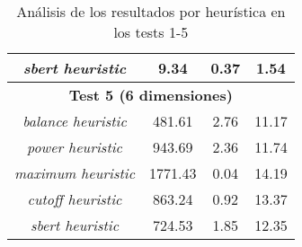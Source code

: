 \documentclass{article}
\begin{document}
\begin{table}[H]
{\begin{tabular}{|c|c|c|c|}
\textit{sbert heuristic} & 9.34 & 0.37 & 1.54 \\ \hline
\multicolumn{4}{|c|}{\textbf{Test 5 (6 dimensiones)}} \\ \hline
\textit{balance heuristic} & 481.61 & 2.76 & 11.17 \\ \hline
\textit{power heuristic} & 943.69 & 2.36 & 11.74 \\ \hline
\textit{maximum heuristic} & 1771.43 & 0.04 & 14.19 \\ \hline
\textit{cutoff heuristic} & 863.24 & 0.92 & 13.37 \\ \hline
\textit{sbert heuristic} & 724.53 & 1.85 & 12.35 \\ \hline
\end{tabular}%
}
\caption{Análisis de los resultados por heurística en los tests 1-5}
\end{table}
\end{document}
